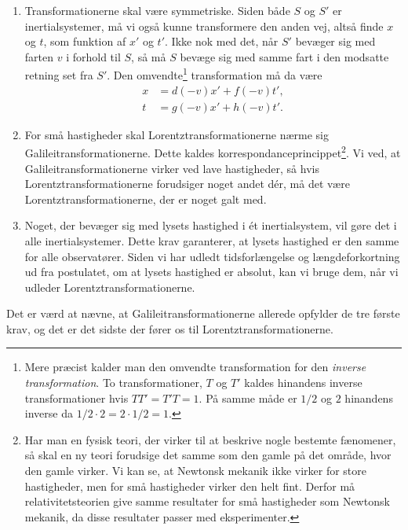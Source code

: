 \begin{enumerate}
    \item Transformationerne skal være symmetriske.
    Siden både $S$ og $S'$ er inertialsystemer, må vi også kunne transformere den anden vej, altså finde $x$ og $t$, som funktion af $x'$ og $t'$.
    Ikke nok med det, når $S'$ bevæger sig med farten $v$ i forhold til $S$, så må $S$ bevæge sig med samme fart i den modsatte retning set fra $S'$.
    Den omvendte\footnote{Mere præcist kalder man den omvendte transformation for den \emph{inverse transformation}. To transformationer, $T$ og $T'$ kaldes hinandens inverse transformationer hvis $TT' = T'T = 1$. På samme måde er $1/2$  og $2$ hinandens inverse da $1/2\cdot 2 = 2\cdot 1/2 = 1$.} transformation må da være
    \begin{subequations}
    \begin{align}
        x &= d(-v)x'+f(-v)t', \\
        t &= g(-v)x'+h(-v)t'.
    \end{align}
    \end{subequations}
    \item For små hastigheder skal Lorentztransformationerne nærme sig Galileitransformationerne. Dette kaldes korrespondanceprincippet\footnote{Har man en fysisk teori, der virker til at beskrive nogle bestemte fænomener, så skal en ny teori forudsige det samme som den gamle på det område, hvor den gamle virker. Vi kan se, at Newtonsk mekanik ikke virker for store hastigheder, men for små hastigheder virker den helt fint. Derfor må relativitetsteorien give samme resultater for små hastigheder som Newtonsk mekanik, da disse resultater passer med eksperimenter.}.
    Vi ved, at Galileitransformationerne virker ved lave hastigheder, så hvis Lorentztransformationerne forudsiger noget andet dér, må det være Lorentztransformationerne, der er noget galt med.
    \item Noget, der bevæger sig med lysets hastighed i ét inertialsystem, vil gøre det i alle inertialsystemer.
    Dette krav garanterer, at lysets hastighed er den samme for alle observatører.
    Siden vi har udledt tidsforlængelse og længdeforkortning ud fra postulatet, om at lysets hastighed er absolut, kan vi bruge dem, når vi udleder Lorentztransformationerne.
\end{enumerate}
%
Det er værd at nævne, at Galileitransformationerne allerede opfylder de tre første krav, og det er det sidste der fører os til Lorentztransformationerne.

